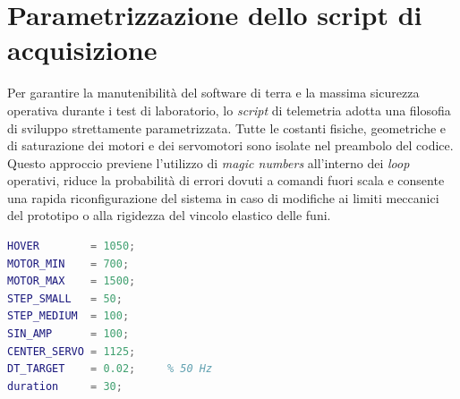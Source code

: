 \documentclass[11pt]{report}
\begin{document}
	\section{Parametrizzazione dello script di acquisizione}
	\label{sec:parametrizzazione}
	
	Per garantire la manutenibilità del software di terra e la massima sicurezza operativa durante i test di laboratorio, lo \textit{script} di telemetria adotta una filosofia di sviluppo strettamente parametrizzata. Tutte le costanti fisiche, geometriche e di saturazione dei motori e dei servomotori sono isolate nel preambolo del codice. Questo approccio previene l'utilizzo di \textit{magic numbers} all'interno dei \textit{loop} operativi, riduce la probabilità di errori dovuti a comandi fuori scala e consente una rapida riconfigurazione del sistema in caso di modifiche ai limiti meccanici del prototipo o alla rigidezza del vincolo elastico delle funi.
	
	\begin{lstlisting}[language=Matlab, caption={Parametri globali dello script di acquisizione}]
%% PARAMETRI PROGRAMMA
HOVER        = 1050;
MOTOR_MIN    = 700;
MOTOR_MAX    = 1500;
STEP_SMALL   = 50;
STEP_MEDIUM  = 100;
SIN_AMP      = 100;
CENTER_SERVO = 1125;
DT_TARGET    = 0.02;     % 50 Hz
duration     = 30;       
	\end{lstlisting}
	
\end{document}
